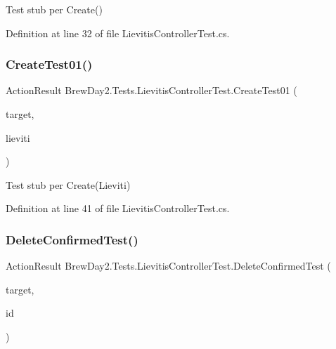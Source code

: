 Test stub per Create()



Definition at line 32 of file Lievitis\+Controller\+Test.\+cs.

\mbox{\label{class_brew_day2_1_1_tests_1_1_lievitis_controller_test_a798d479f3f7bbb8305c4e00d00da19ca}} 
\subsubsection{\texorpdfstring{Create\+Test01()}{CreateTest01()}}
{\footnotesize\ttfamily Action\+Result Brew\+Day2.\+Tests.\+Lievitis\+Controller\+Test.\+Create\+Test01 (\begin{DoxyParamCaption}\item[{\mbox{[}\+Pex\+Assume\+Under\+Test\mbox{]} \mbox{\hyperlink{class_brew_day2_1_1_controllers_1_1_lievitis_controller}{Lievitis\+Controller}}}]{target,  }\item[{\mbox{\hyperlink{class_brew_day2_1_1_models_1_1_lieviti}{Lieviti}}}]{lieviti }\end{DoxyParamCaption})}



Test stub per Create(\+Lieviti)



Definition at line 41 of file Lievitis\+Controller\+Test.\+cs.

\mbox{\label{class_brew_day2_1_1_tests_1_1_lievitis_controller_test_abd0cc71f09e91beb09e5fd64738fb213}} 
\subsubsection{\texorpdfstring{Delete\+Confirmed\+Test()}{DeleteConfirmedTest()}}
{\footnotesize\ttfamily Action\+Result Brew\+Day2.\+Tests.\+Lievitis\+Controller\+Test.\+Delete\+Confirmed\+Test (\begin{DoxyParamCaption}\item[{\mbox{[}\+Pex\+Assume\+Under\+Test\mbox{]} \mbox{\hyperlink{class_brew_day2_1_1_controllers_1_1_lievitis_controller}{Lievitis\+Controller}}}]{target,  }\item[{int}]{id }\end{DoxyParamCaption})}



